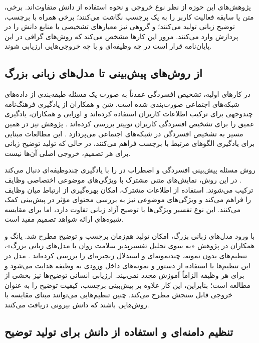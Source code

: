 پژوهش‌های این حوزه از نظر نوع خروجی و نحوه استفاده از دانش متفاوت‌اند. برخی، متن یا سابقه فعالیت کاربر را به یک برچسب نگاشت می‌کنند؛ برخی همراه با برچسب، توضیح زبانی تولید می‌کنند؛ و گروهی نیز معیارهای تشخیصی یا منابع دانش را در پردازش وارد می‌کنند. مرور این کارها مشخص می‌کند که روش‌های گرافی در این پایان‌نامه قرار است در چه وظیفه‌ای و با چه خروجی‌هایی ارزیابی شوند.

\subsection{از روش‌های پیش‌بینی تا مدل‌های زبانی بزرگ}

در کارهای اولیه، تشخیص افسردگی عمدتاً به صورت یک مسئله طبقه‌بندی از داده‌های شبکه‌های اجتماعی صورت‌بندی شده است. شن و همکاران از یادگیری فرهنگ‌نامه چندوجهی برای ترکیب اطلاعات کاربران استفاده کرده‌اند و اورابی و همکاران، یادگیری عمیق را برای تشخیص افسردگی کاربران توییتر بررسی کرده‌اند \cite{shen2017depression,orabi2018deep}. پژوهش  نیز در همین مسیر به تشخیص افسردگی در شبکه‌های اجتماعی می‌پردازد \cite{lin2020sensemood}. این مطالعات مبنایی برای یادگیری الگوهای مرتبط با برچسب فراهم می‌کنند، در حالی که تولید توضیح زبانی برای هر تصمیم، خروجی اصلی آن‌ها نیست.

روش  مسئله پیش‌بینی افسردگی و اضطراب در  را با یادگیری چندوظیفه‌ای دنبال می‌کند \cite{sarkar2023predicting}. در این روش، نمایش‌های متنی مشترک با ویژگی‌های موضوعی اختصاصی وظایف ترکیب می‌شوند. استفاده از اطلاعات مشترک، امکان بهره‌گیری از ارتباط میان وظایف را فراهم می‌کند و ویژگی‌های موضوعی نیز به بررسی محتوای مؤثر در پیش‌بینی کمک می‌کنند. این نوع تفسیر ویژگی‌ها با توضیح آزاد زبانی تفاوت دارد، اما برای مقایسه شیوه‌های ارائه شواهد تصمیم مفید است.

با ورود مدل‌های زبانی بزرگ، امکان تولید هم‌زمان برچسب و توضیح مطرح شد. یانگ و همکاران در پژوهش «به سوی تحلیل تفسیرپذیر سلامت روان با مدل‌های زبانی بزرگ»، تنظیم‌های بدون نمونه، چندنمونه‌ای و استدلال زنجیره‌ای را بررسی کرده‌اند \cite{yang2023towards}. مدل در این تنظیم‌ها با استفاده از دستور و نمونه‌های داخل ورودی به وظیفه هدایت می‌شود و برای هر وظیفه الزاماً آموزش مجدد نمی‌بیند. ارزیابی انسانی توضیح‌ها نیز بخشی از مطالعه است؛ بنابراین، این کار علاوه بر پیش‌بینی برچسب، کیفیت توضیح را به عنوان خروجی قابل سنجش مطرح می‌کند. چنین تنظیم‌هایی می‌توانند مبنای مقایسه با روش‌هایی باشند که دانش بیرونی دریافت می‌کنند.

\subsection{تنظیم دامنه‌ای و استفاده از دانش برای تولید توضیح}

